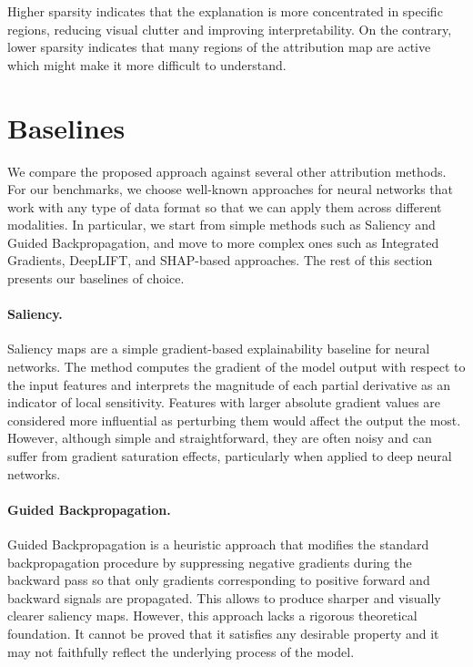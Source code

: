 Higher sparsity indicates that the explanation is more concentrated in specific regions, reducing visual clutter and improving interpretability. On the contrary, lower sparsity indicates that many regions of the attribution map are active which might make it more difficult to understand.




\section{Baselines} \label{sec:baselines}

We compare the proposed approach against several other attribution methods. For our benchmarks, we choose well-known approaches for neural networks that work with any type of data format so that we can apply them across different modalities. In particular, we start from simple methods such as Saliency and Guided Backpropagation, and move to more complex ones such as Integrated Gradients, DeepLIFT, and SHAP-based approaches. The rest of this section presents our baselines of choice.

\paragraph{Saliency.} Saliency maps \cite{saliency} are a simple gradient-based explainability baseline for neural networks. The method computes the gradient of the model output with respect to the input features and interprets the magnitude of each partial derivative as an indicator of local sensitivity. Features with larger absolute gradient values are considered more influential as perturbing them would affect the output the most. However, although simple and straightforward, they are often noisy and can suffer from gradient saturation effects, particularly when applied to deep neural networks.

\paragraph{Guided Backpropagation.}
Guided Backpropagation \cite{guided_backprop} is a heuristic approach that modifies the standard backpropagation procedure by suppressing negative gradients during the backward pass so that only gradients corresponding to positive forward and backward signals are propagated. This allows to produce sharper and visually clearer saliency maps. However, this approach lacks a rigorous theoretical foundation. It cannot be proved that it satisfies any desirable property and it may not faithfully reflect the underlying process of the model.


